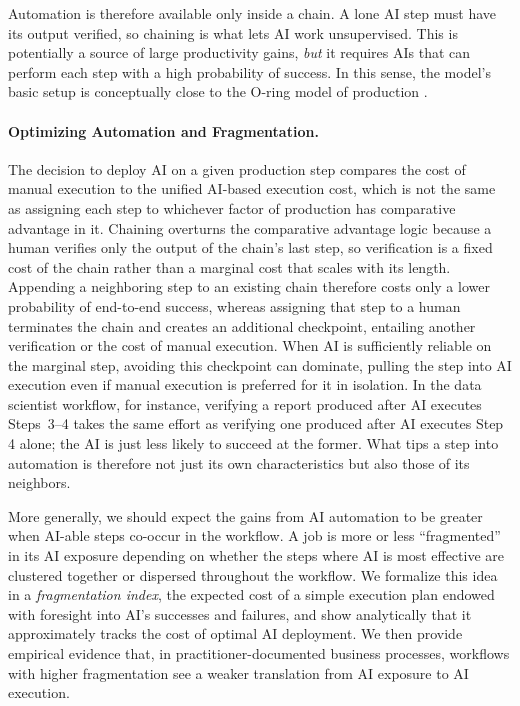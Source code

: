 Automation is therefore available only inside a chain.
A lone AI step must have its output verified, so chaining is what lets AI work unsupervised.
This is potentially a source of large productivity gains, \emph{but} it requires AIs that can perform each step with a high probability of success.
In this sense, the model's basic setup is conceptually close to the O-ring model of production \citep{kremer1993oring, gans2026oring}.

\paragraph{Optimizing Automation and Fragmentation.}
The decision to deploy AI on a given production step compares the cost of manual execution to the unified AI-based execution cost, which is not the same as assigning each step to whichever factor of production has comparative advantage in it.
Chaining overturns the comparative advantage logic because a human verifies only the output of the chain's last step, so verification is a fixed cost of the chain rather than a marginal cost that scales with its length.
Appending a neighboring step to an existing chain therefore costs only a lower probability of end-to-end success, whereas assigning that step to a human terminates the chain and creates an additional checkpoint, entailing another verification or the cost of manual execution.
When AI is sufficiently reliable on the marginal step, avoiding this checkpoint can dominate, pulling the step into AI execution even if manual execution is preferred for it in isolation.
In the data scientist workflow, for instance, verifying a report produced after AI executes Steps~3--4 takes the same effort as verifying one produced after AI executes Step 4 alone; the AI is just less likely to succeed at the former.
What tips a step into automation is therefore not just its own characteristics but also those of its neighbors.

More generally, we should expect the gains from AI automation to be greater when AI-able steps co-occur in the workflow.
A job is more or less ``fragmented'' in its AI exposure depending on whether the steps where AI is most effective are clustered together or dispersed throughout the workflow.
We formalize this idea in a \emph{fragmentation index}, the expected cost of a simple execution plan endowed with foresight into AI's successes and failures, and show analytically that it approximately tracks the cost of optimal AI deployment.
We then provide empirical evidence that, in practitioner-documented business processes, workflows with higher fragmentation see a weaker translation from AI exposure to AI execution.

